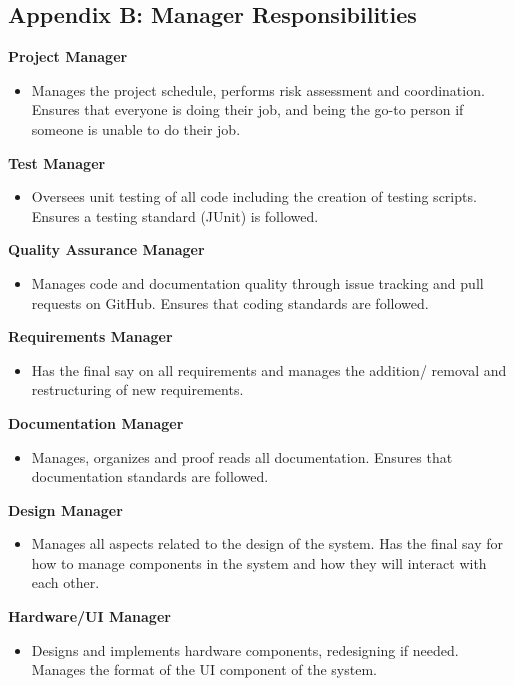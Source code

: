 \documentclass[11pt, a4paper]{article}
\begin{document}
\begin{flushleft}
\subsection{Appendix B: Manager Responsibilities}
	\textbf{Project Manager}
	\begin{itemize}
	\item Manages the project schedule, performs risk assessment and coordination. Ensures that everyone is doing their job, and being the go-to person if someone is unable to do their job.
	\end{itemize}
	\textbf{Test Manager}
	\begin{itemize}
    \item Oversees unit testing of all code including the creation of testing scripts. Ensures a testing standard (JUnit) is followed.
	\end{itemize}
	\textbf{Quality Assurance Manager}
	\begin{itemize}
    \item Manages code and documentation quality through issue tracking and pull requests on GitHub. Ensures that coding standards are followed.
	\end{itemize}
	\textbf{Requirements Manager}
	\begin{itemize}
	\item Has the final say on all requirements and manages the addition/ removal and restructuring of new requirements.
	\end{itemize}
    \textbf{Documentation Manager}
    \begin{itemize}
    \item Manages, organizes and proof reads all documentation. Ensures that documentation standards are followed.
    \end{itemize}
    \textbf{Design Manager}
    \begin{itemize}
    \item Manages all aspects related to the design of the system. Has the final say for how to manage components in the system and how they will interact with each other.
    \end{itemize}
    \textbf{Hardware/UI Manager}
    \begin{itemize}
    \item Designs and implements hardware components, redesigning if needed. Manages the format of the UI component of the system.
    \end{itemize}
    

\end{flushleft}
\end{document}
